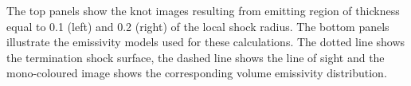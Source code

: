 \label{thickness-effect}{The top panels show the knot images resulting from emitting region of thickness equal to 0.1 (left) and 0.2 (right) of the local shock radius. The bottom panels illustrate the emissivity models used for these calculations. The dotted line shows the termination shock surface, the dashed line shows the line of sight and the mono-coloured image shows the corresponding volume emissivity distribution. 
}
